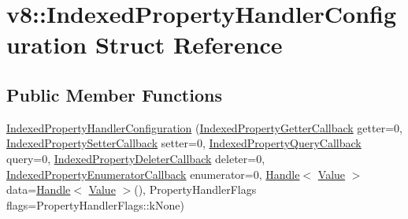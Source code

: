 \hypertarget{structv8_1_1_indexed_property_handler_configuration}{}\section{v8\+:\+:Indexed\+Property\+Handler\+Configuration Struct Reference}
\label{structv8_1_1_indexed_property_handler_configuration}
\subsection*{Public Member Functions}
\begin{DoxyCompactItemize}
\item 
\hyperlink{structv8_1_1_indexed_property_handler_configuration_a7a5eac48b07049cefccfc952fbd47613}{Indexed\+Property\+Handler\+Configuration} (\hyperlink{namespacev8_a48e7816ba64447bf32a25d194588daaf}{Indexed\+Property\+Getter\+Callback} getter=0, \hyperlink{namespacev8_a4ac7cc6185ebc8b6a199f9fa8e6bf5c3}{Indexed\+Property\+Setter\+Callback} setter=0, \hyperlink{namespacev8_a980b62c33eb664783e61e25c3b27f9ee}{Indexed\+Property\+Query\+Callback} query=0, \hyperlink{namespacev8_a53863728de14cde48dd6543207b2f2da}{Indexed\+Property\+Deleter\+Callback} deleter=0, \hyperlink{namespacev8_adbb0a6d5537371953f9ba807d4f6275e}{Indexed\+Property\+Enumerator\+Callback} enumerator=0, \hyperlink{classv8_1_1_handle}{Handle}$<$ \hyperlink{classv8_1_1_value}{Value} $>$ data=\hyperlink{classv8_1_1_handle}{Handle}$<$ \hyperlink{classv8_1_1_value}{Value} $>$(), Property\+Handler\+Flags flags=Property\+Handler\+Flags\+::k\+None)
\end{DoxyCompactItemize}
